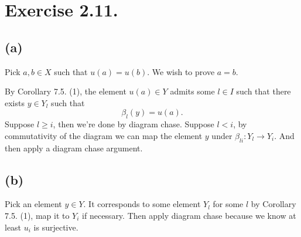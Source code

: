 \section{Exercise 2.11.}

\subsection{(a)}

Pick $a,b\in X$ such that $u(a)=u(b)$. We wish to prove $a=b$. 

By \cite{altman2013term} Corollary 7.5. (1), the element $u(a)\in Y$ admits some $l\in I$ such that there exists $y\in Y_l$ such that \[\beta_l(y)=u(a).\]
Suppose $l\geq i$, then we're done by diagram chase.
Suppose $l<i$, by commutativity of the diagram we can map the element $y$ under $\beta_{li}:Y_l\to Y_i$. And then apply a diagram chase argument. 

\subsection{(b)}

Pick an element $y\in Y$. It corresponds to some element $Y_l$ for some $l$ by Corollary 7.5. (1), map it to $Y_i$ if necessary. Then apply diagram chase because we know at least $u_i$ is surjective.